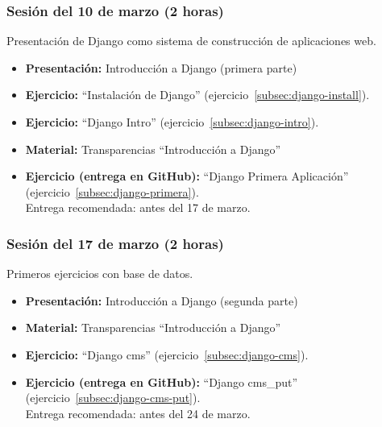 \documentclass[a4paper,12pt]{article}
\begin{document}
\subsubsection{Sesión del 10 de marzo (2 horas)}

Presentación de Django como sistema de construcción de aplicaciones web.

\begin{itemize}
 \item \textbf{Presentación:} Introducción a Django (primera parte)
 \item \textbf{Ejercicio:} ``Instalación de Django'' (ejercicio~\ref{subsec:django-install}).
 \item \textbf{Ejercicio:} ``Django Intro'' (ejercicio~\ref{subsec:django-intro}).
 \item \textbf{Material:} Transparencias ``Introducción a Django''
 \item \textbf{Ejercicio (entrega en GitHub):} ``Django Primera Aplicación'' (ejercicio~\ref{subsec:django-primera}). \\
    Entrega recomendada: antes del 17 de marzo.
\end{itemize}

\subsubsection{Sesión del 17 de marzo (2 horas)}

Primeros ejercicios con base de datos.

\begin{itemize}
 \item \textbf{Presentación:} Introducción a Django (segunda parte)
 \item \textbf{Material:} Transparencias ``Introducción a Django''

 \item \textbf{Ejercicio:} ``Django cms'' (ejercicio~\ref{subsec:django-cms}).
 \item \textbf{Ejercicio (entrega en GitHub):} ``Django cms\_put'' (ejercicio~\ref{subsec:django-cms-put}).\\
    Entrega recomendada: antes del 24 de marzo.
 
\end{itemize}

\end{document}
